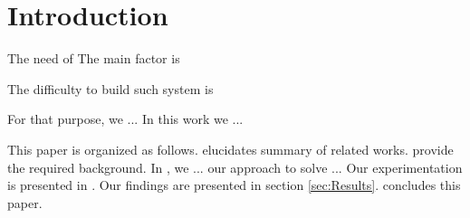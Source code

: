 \section{Introduction} \label{sec:Introduction}

The need of
The main factor is

The difficulty to build such system is 






For that purpose,
	we ...
In this work we ...

This paper is organized as follows.
 elucidates summary of related works.
 provide the required background.
In ,
	we ... our approach to solve ...
Our experimentation is presented in .
Our findings are presented in section \ref{sec:Results}.
 concludes this paper.




